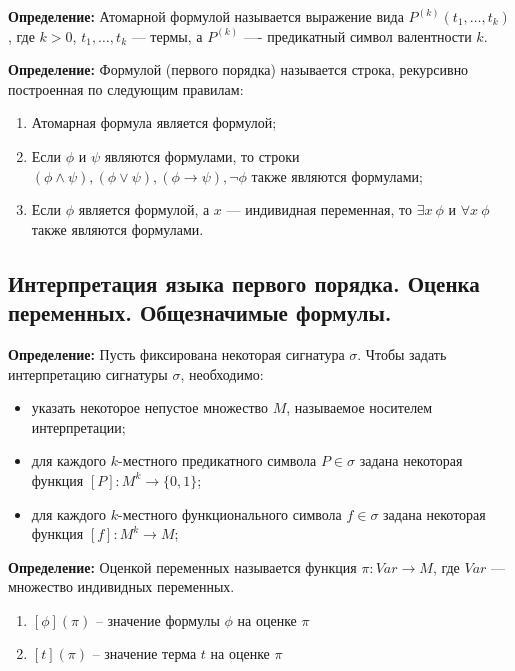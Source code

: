 \textbf{Определение:} Атомарной формулой называется выражение вида $P^{(k)}(t_1, \ldots,t_k)$ , где $k>0$, $t_1,\ldots,t_k$ — термы, а $P^{(k)}$ —- предикатный символ валентности $k$.

\textbf{Определение:} Формулой (первого порядка) называется строка, рекурсивно построенная по следующим правилам:
\begin{enumerate}
    \item Атомарная формула является формулой;
    \item Если $\phi$ и $\psi$ являются формулами, то строки $(\phi \land \psi), (\phi \lor \psi), (\phi \to \psi), \neg\phi$ также являются формулами;
    \item Если $\phi$ является формулой, а $x$ — индивидная переменная, то $\exists x \ \phi$ и $\forall x \ \phi$ также являются формулами.
\end{enumerate}


\subsection{Интерпретация языка первого порядка. Оценка переменных. Общезначимые формулы.}
\textbf{Определение:} Пусть фиксирована некоторая сигнатура $\sigma$. Чтобы задать интерпретацию сигнатуры $\sigma$, необходимо:
\begin{itemize}
    \item указать некоторое непустое множество $M$, называемое носителем интерпретации;
    \item для каждого $k$-местного предикатного символа $P\in \sigma$ задана некоторая функция $[P]:M^k\to \{0,1\}$;
    \item для каждого $k$-местного функционального символа $f\in \sigma$ задана некоторая функция $[f]:M^k\to M$;
\end{itemize}

\textbf{Определение:} Оценкой переменных называется функция $\pi : Var \to M$, где $Var$ — множество индивидных переменных.
\begin{enumerate}
    \item $[\phi](\pi)$ -- значение формулы $\phi$ на оценке $\pi$
    \item $[t](\pi)$ -- значение терма $t$ на оценке $\pi$
\end{enumerate}


